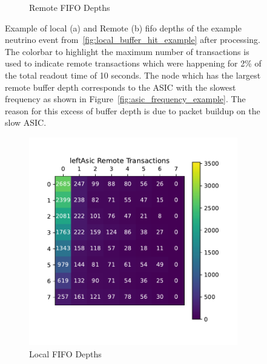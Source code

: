 \begin{figure}
\begin{subfigure}{.5\textwidth}
  \caption{Remote FIFO Depths}
\end{subfigure}
\caption{Example of local (a) and Remote (b) fifo depths of the example neutrino event from~\ref{fig:local_buffer_hit_example} after processing. 
The colorbar to highlight the maximum number of transactions is used to indicate remote transactions which were happening for 2\% of the total readout time of 10 seconds.
The node which has the largest remote buffer depth corresponds to the ASIC with the slowest frequency as shown in Figure~\ref{fig:asic_frequency_example}.
The reason for this excess of buffer depth is due to packet buildup on the slow ASIC.
}
\label{fig:snake_example_neutrino}
\end{figure}


\begin{figure}
\centering
\begin{subfigure}{.5\textwidth}
  \centering
  \includegraphics[width=\textwidth]{images/left_asic_trans.pdf}
  \caption{Local FIFO Depths}
\end{subfigure}%
\begin{subfigure}{.5\textwidth}
  \centering

\end{subfigure}
\end{figure}
